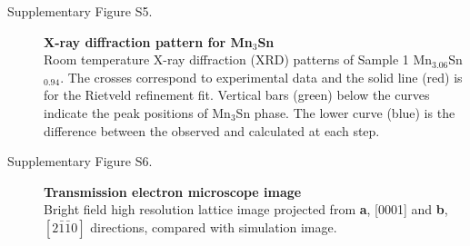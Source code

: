 \documentclass[amsmath,amssymb]{nature}
\begin{document}
\begin{description}
		
		\item[Supplementary Figure S5.]
		{\bf X-ray diffraction pattern for Mn$_3$Sn}\\  Room temperature X-ray diffraction (XRD) patterns of Sample 1 Mn$_{3.06}$Sn$_{0.94}$. The crosses correspond to experimental data and the solid line (red) is for the Rietveld refinement fit. Vertical bars (green) below the curves indicate the peak positions of Mn$_3$Sn phase. The lower curve (blue) is the difference between the observed and calculated at each step.\color{black}
		
		\item[Supplementary Figure S6.]
		{\bf Transmission electron microscope image}\\ Bright field high resolution lattice image projected from  {\bf{a}}, [0001]  and {\bf{b}}, $[2\bar{1}\bar{1}0]$ directions, compared with simulation image. \color{black}
		
	\end{description}
	
	



	
\end{document}
